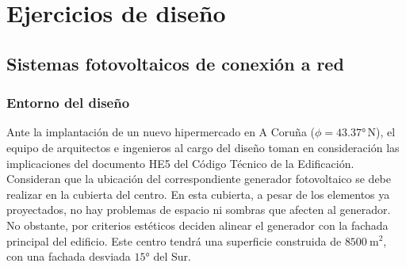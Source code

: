 \chapter{Ejercicios de diseño}


 \section{Sistemas fotovoltaicos de conexión a red}


 \subsection{Entorno del diseño}

Ante la implantación de un nuevo hipermercado en A Coruña ($\phi=\ang{43.37}\mathrm{\, N}$),
el equipo de arquitectos e ingenieros al cargo del diseño toman en
consideración las implicaciones del documento HE5 del Código Técnico
de la Edificación. Consideran que la ubicación del correspondiente
generador fotovoltaico se debe realizar en la cubierta del centro.
En esta cubierta, a pesar de los elementos ya proyectados, no hay
problemas de espacio ni sombras que afecten al generador. No obstante,
por criterios estéticos deciden alinear el generador con la fachada
principal del edificio. Este centro tendrá una superficie construida
de $\SI{8500}{\meter\squared}$, con una fachada desviada $\ang{15}$
del Sur. 
